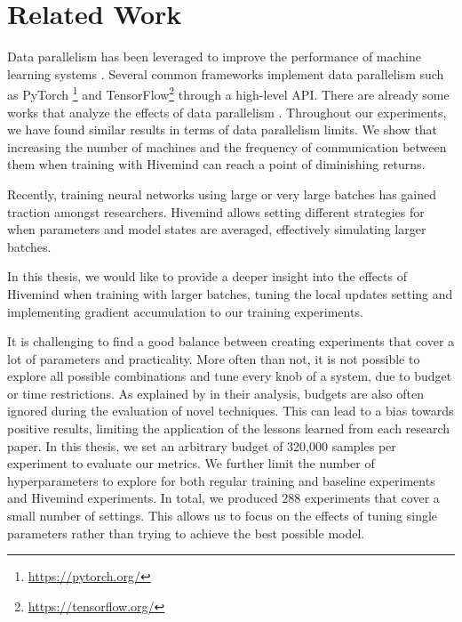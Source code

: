\chapter{Related Work}\label{chapter:related-work}
Data parallelism has been leveraged to improve the performance of machine learning systems \cite{alexnet2012}.
Several common frameworks implement data parallelism such as PyTorch \footnote{\href{https://pytorch.org/}{https://pytorch.org/}} and TensorFlow\footnote{\href{https://tensorflow.org/}{https://tensorflow.org/}} through a high-level API.
There are already some works that analyze the effects of data parallelism \cite{DBLP:journals/corr/abs-2003-11316,DBLP:journals/corr/abs-1811-03600}.
Throughout our experiments, we have found similar results in terms of data parallelism limits.
We show that increasing the number of machines and the frequency of communication between them when training with Hivemind can reach a point of diminishing returns.

Recently, training neural networks using large or very large batches \cite{DBLP:journals/corr/KeskarMNST16, 10.48550/arxiv.1705.08741} has gained traction amongst researchers.
Hivemind allows setting different strategies for when parameters and model states are averaged, effectively simulating larger batches.
\cite{DBLP:journals/corr/abs-2106-10207}

In this thesis, we would like to provide a deeper insight into the effects of Hivemind when training with larger batches, tuning the local updates setting and implementing gradient accumulation to our training experiments.

It is challenging to find a good balance between creating experiments that cover a lot of parameters and practicality.
More often than not, it is not possible to explore all possible combinations and tune every knob of a system, due to budget or time restrictions.
As explained by  in their analysis, budgets are also often ignored during the evaluation of novel techniques.
This can lead to a bias towards positive results, limiting the application of the lessons learned from each research paper.
In this thesis, we set an arbitrary budget of 320,000 samples per experiment to evaluate our metrics.
We further limit the number of hyperparameters to explore for both regular training and baseline experiments and Hivemind experiments.
In total, we produced 288 experiments that cover a small number of settings.
This allows us to focus on the effects of tuning single parameters rather than trying to achieve the best possible model.

